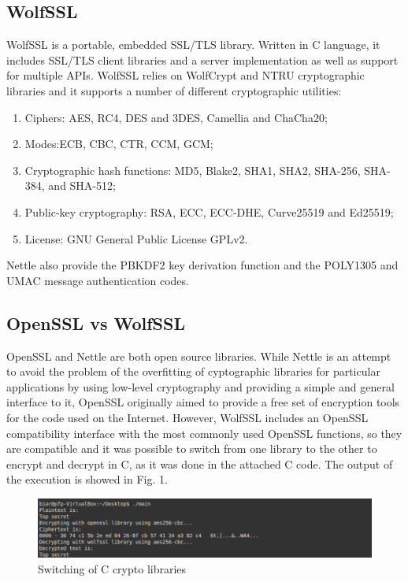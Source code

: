 \documentclass[11 pt]{article}
\begin{document}
\subsection{WolfSSL} 
WolfSSL is a portable, embedded SSL/TLS library.  Written in C language, it includes SSL/TLS client libraries and a server implementation as well as support for multiple APIs. WolfSSL relies on WolfCrypt and NTRU cryptographic libraries and it supports a number of different cryptographic utilities:
\begin{enumerate}
	\item Ciphers: AES, RC4, DES and 3DES, Camellia and ChaCha20;
	\item Modes:ECB, CBC, CTR, CCM, GCM;
	\item Cryptographic hash functions: MD5, Blake2,	SHA1, SHA2, SHA-256, SHA-384, and SHA-512;
	\item Public-key cryptography: RSA, ECC,	ECC-DHE, Curve25519 and	Ed25519;
	\item License: GNU General Public License GPLv2. 
\end{enumerate}
Nettle also provide the PBKDF2 key derivation function and the POLY1305 and UMAC message authentication codes.\\

\subsection{OpenSSL vs WolfSSL}
OpenSSL and Nettle are both open source libraries. While Nettle is an attempt to avoid the problem of the overfitting of cyptographic libraries for particular applications by using  low-level cryptography and providing a simple and general interface to it, OpenSSL originally aimed to provide a free set of encryption tools for the code used on the Internet.
However, WolfSSL includes an OpenSSL compatibility interface with the most commonly used OpenSSL functions, so they are compatible and it was possible to switch from one library to the other to encrypt and decrypt in C, as it was done in the attached C code. The output of the execution is showed in Fig. 1.

\begin{figure}[!h]
\includegraphics[width=1\textwidth]{c_output-hw4-1743261.png}
\caption{Switching of C crypto libraries}
\end{figure}
\end{document}

